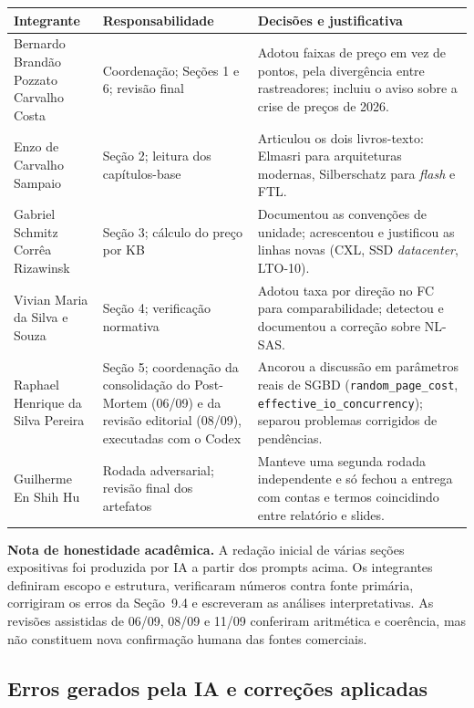 \documentclass[11pt,a4paper]{article}
\begin{document}
\begin{center}\small
\begin{tabular}{@{}p{3.3cm}p{4.3cm}p{7.2cm}@{}}
\toprule
\textbf{Integrante} & \textbf{Responsabilidade} & \textbf{Decisões e justificativa} \\
\midrule
Bernardo Brandão Pozzato Carvalho Costa & Coordenação; Seções 1 e 6; revisão final & Adotou faixas de preço em vez de pontos, pela divergência entre rastreadores; incluiu o aviso sobre a crise de preços de 2026. \\
Enzo de Carvalho Sampaio & Seção 2; leitura dos capítulos-base & Articulou os dois livros-texto: Elmasri para arquiteturas modernas, Silberschatz para \emph{flash} e FTL. \\
Gabriel Schmitz Corrêa Rizawinsk & Seção 3; cálculo do preço por KB & Documentou as convenções de unidade; acrescentou e justificou as linhas novas (CXL, SSD \emph{datacenter}, LTO-10). \\
Vivian Maria da Silva e Souza & Seção 4; verificação normativa & Adotou taxa por direção no FC para comparabilidade; detectou e documentou a correção sobre NL-SAS. \\
Raphael Henrique da Silva Pereira & Seção 5; coordenação da consolidação do Post-Mortem (06/09) e da revisão editorial (08/09), executadas com o Codex & Ancorou a discussão em parâmetros reais de SGBD (\texttt{random\_page\_cost}, \texttt{effective\_io\_concurrency}); separou problemas corrigidos de pendências. \\
Guilherme En Shih Hu & Rodada adversarial; revisão final dos artefatos & Manteve uma segunda rodada independente e só fechou a entrega com contas e termos coincidindo entre relatório e slides. \\
\bottomrule
\end{tabular}
\end{center}

\textbf{Nota de honestidade acadêmica.} A redação inicial de várias seções expositivas foi
produzida por IA a partir dos prompts acima. Os integrantes definiram escopo e estrutura,
verificaram números contra fonte primária, corrigiram os erros da Seção~9.4 e escreveram as
análises interpretativas. As revisões assistidas de 06/09, 08/09 e 11/09 conferiram
aritmética e coerência, mas não constituem nova confirmação humana das fontes comerciais.

\subsection{Erros gerados pela IA e correções aplicadas}
\end{document}
